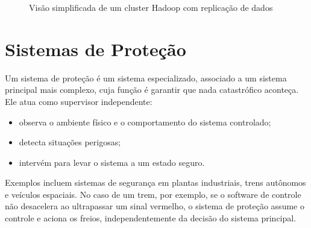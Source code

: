 \documentclass[12pt,a4paper,twoside]{report}
\begin{document}
\begin{figure}[h]
    \centering
    \caption{Visão simplificada de um cluster Hadoop com replicação de dados}
    \label{fig:hadoop-simples}
\end{figure}

\section{Sistemas de Proteção}

Um sistema de proteção é um sistema especializado, associado a um sistema
principal mais complexo, cuja função é garantir que nada catastrófico
aconteça. Ele atua como supervisor independente:
\begin{itemize}[nosep]
    \item observa o ambiente físico e o comportamento do sistema controlado;
    \item detecta situações perigosas;
    \item intervém para levar o sistema a um estado seguro.
\end{itemize}

Exemplos incluem sistemas de segurança em plantas industriais, trens
autônomos e veículos espaciais. No caso de um trem, por exemplo, se o
software de controle não desacelera ao ultrapassar um sinal vermelho, o
sistema de proteção assume o controle e aciona os freios, independentemente
da decisão do sistema principal.
\end{document}
